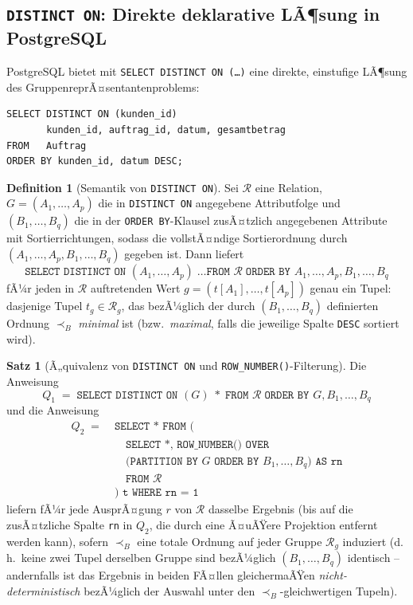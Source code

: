 ﻿\documentclass[a4paper,12pt]{report}
\theoremstyle{definition}
\newtheorem{definition}{Definition}[chapter]
\newtheorem{theorem}{Satz}[chapter]
\theoremstyle{remark}
\newcommand{\R}{\mathcal{R}}
\begin{document}
\subsection{\texttt{DISTINCT ON}: Direkte deklarative LÃ¶sung in PostgreSQL}
\label{sec:distinct-on-postgres}

PostgreSQL bietet mit \texttt{SELECT DISTINCT ON (\ldots)} eine
direkte, einstufige LÃ¶sung des GruppenreprÃ¤sentantenproblems:

\begin{lstlisting}
SELECT DISTINCT ON (kunden_id)
       kunden_id, auftrag_id, datum, gesamtbetrag
FROM   Auftrag
ORDER BY kunden_id, datum DESC;
\end{lstlisting}

\begin{definition}[Semantik von \texttt{DISTINCT ON}]
\label{def:distinct-on}
Sei $\R$ eine Relation, $G=(A_1,\ldots,A_p)$ die in
\texttt{DISTINCT ON} angegebene Attributfolge und
$(B_1,\ldots,B_q)$ die in der \texttt{ORDER BY}-Klausel zusÃ¤tzlich
angegebenen Attribute mit Sortierrichtungen, sodass die vollstÃ¤ndige
Sortierordnung durch $(A_1,\ldots,A_p,B_1,\ldots,B_q)$ gegeben ist.
Dann liefert
\[
  \texttt{SELECT DISTINCT ON } (A_1,\ldots,A_p)\;
  \texttt{\ldots FROM } \R \;
  \texttt{ORDER BY } A_1,\ldots,A_p,B_1,\ldots,B_q
\]
fÃ¼r jeden in $\R$ auftretenden Wert $g=(t[A_1],\ldots,t[A_p])$ genau
ein Tupel: dasjenige Tupel $t_g\in\R_g$, das bezÃ¼glich der durch
$(B_1,\ldots,B_q)$ definierten Ordnung $\prec_B$ \emph{minimal} ist
(bzw.\ \emph{maximal}, falls die jeweilige Spalte \texttt{DESC}
sortiert wird).
\end{definition}

\begin{theorem}[Ã„quivalenz von \texttt{DISTINCT ON} und
\texttt{ROW\_NUMBER()}-Filterung]
\label{thm:distinct-on-aequivalenz}
Die Anweisung
\[
  Q_1 \;=\; \texttt{SELECT DISTINCT ON } (G)\; * \;
  \texttt{FROM } \R \;\texttt{ORDER BY } G, B_1,\ldots,B_q
\]
und die Anweisung
\begin{align*}
  Q_2 \;=\; & \texttt{SELECT * FROM (}\\
  & \quad\texttt{SELECT *, ROW\_NUMBER() OVER}\\
  & \quad\texttt{(PARTITION BY } G \texttt{ ORDER BY }
    B_1,\ldots,B_q\texttt{) AS rn}\\
  & \quad\texttt{FROM } \R\\
  & \texttt{) t WHERE rn = 1}
\end{align*}
liefern fÃ¼r jede AusprÃ¤gung $r$ von $\R$ dasselbe Ergebnis (bis auf
die zusÃ¤tzliche Spalte \texttt{rn} in $Q_2$, die durch eine Ã¤uÃŸere
Projektion entfernt werden kann), sofern $\prec_B$ eine totale Ordnung
auf jeder Gruppe $\R_g$ induziert (d.\,h.\ keine zwei Tupel derselben
Gruppe sind bezÃ¼glich $(B_1,\ldots,B_q)$ identisch -- andernfalls ist
das Ergebnis in beiden FÃ¤llen gleichermaÃŸen \emph{nicht-deterministisch}
bezÃ¼glich der Auswahl unter den $\prec_B$-gleichwertigen Tupeln).
\end{theorem}
\end{document}
